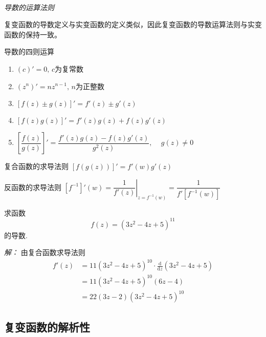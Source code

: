 ~\\
\noindent\emph{导数的运算法则} 

复变函数的导数定义与实变函数的定义类似，因此复变函数的导数运算法则与实变函数的保持一致。
\begin{compactenum}[(1)]
  \item 导数的四则运算
  \begin{enumerate}
    \item $(c)' =0, \, c$为复常数 \vspace{0.3em}
    \item $(z^n)' =n z^{n-1}, \, n$为正整数 \vspace{0.3em}
    \item $ [f(z) \pm g(z)]' = f'(z) \pm g'(z)$ \vspace{0.3em}
    \item $ [f(z) g(z)]' = f'(z) g(z) + f(z) g'(z) $ \vspace{0.3em}
    \item $ \left[\dfrac{f(z)}{g(z)} \right]' = \dfrac{f'(z) g(z) - f(z) g'(z)}{g^2(z)}, \, \quad  g(z) \ne 0 $ 
  \end{enumerate}
  \item 复合函数的求导法则 $\left[ f(g(z))\right]' = f'(w)g'(z)$ 
  \item 反函数的求导法则  $ [f^{-1}]'(w)  = \left. \dfrac{1}{f'(z)} \right|_{z=f^{-1}(w)} = \dfrac{1}{f'[f^{-1}(w)]}  $
\end{compactenum}


\begin{example}
  求函数
    \[ f(z) = (3z^2 -4z +5)^{11}\]
  的导数.
\end{example}
\emph{解：} 由复合函数求导法则
\[ \begin{aligned}
  f'(z) &= 11 (3z^2 -4z +5)^{10} \cdot \frac{\mathrm{d}}{\mathrm{d}z } (3z^2 -4z +5) \\ 
  &=  11 (3z^2 -4z +5)^{10} (6z-4) \\
  &= 22(3z-2)(3z^2 -4z +5 )^{10}
\end{aligned}\]

\subsection{复变函数的解析性}


